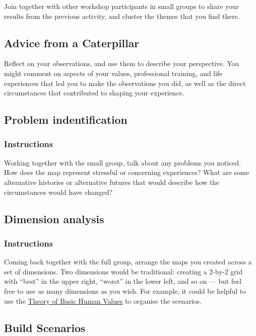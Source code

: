 \documentclass[11pt]{article}
\begin{document}
Join together with other workshop participants in small groups to
share your results from the previous activity, and cluster the themes
that you find there.
\subsection{Advice from a Caterpillar}
\label{0ef4b185-513f-40c2-b884-6213601bbe09}
Reflect on your observations, and use them to describe your
perspective.  You might comment on aspects of your values,
professional training, and life experiences that led you to make the
observations you did, as well as the direct circumstances that
contributed to shaping your experience.
\subsection{Problem indentification}
\label{sec:org769d413}

\subsubsection{Instructions}
\label{sec:org6cc932b}
Working together with the small group, talk about any problems you
noticed.  How does the map represent stressful or concerning
experiences?  What are some alternative histories or alternative
futures that would describe how the circumstances would have changed?
\subsection{Dimension analysis}
\label{sec:org67443d9}

\subsubsection{Instructions}
\label{sec:orgcf1fd4c}

Coming back together with the full group, arrange the maps you created
across a set of dimensions.  Two dimensions would be traditional:
creating a 2-by-2 grid with ``best'' in the upper right, ``worst'' in
the lower left, and so on — but feel free to use as many dimensions as
you wish.  For example, it could be helpful to use the \href{https://en.wikipedia.org/wiki/Theory\_of\_Basic\_Human\_Values}{Theory of Basic
Human Values} to organise the scenarios.
\subsection{Build Scenarios}
\label{sec:orgf3992ba}
\end{document}
